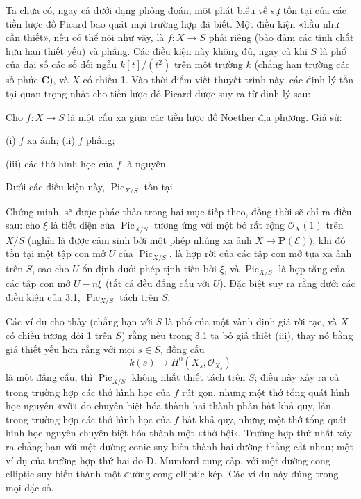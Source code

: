 
Ta chưa có, ngay cả dưới dạng phỏng đoán, một phát biểu về sự tồn tại của các
tiền lược đồ Picard bao quát mọi trường hợp đã biết. Một điều kiện «hầu như
cần thiết», nếu có thể nói như vậy, là $f:X\longrightarrow S$ phải riêng (bảo
đảm các tính chất hữu hạn thiết yếu) và phẳng. Các điều kiện này không đủ,
ngay cả khi $S$ là phổ của đại số các số đối ngẫu $k[t]/(t^2)$ trên một trường
$k$ (chẳng hạn trường các số phức $\mathbf C$), và $X$ có chiều 1. Vào thời
điểm viết thuyết trình này, các định lý tồn tại quan trọng nhất cho tiền lược
đồ Picard được suy ra từ định lý sau:

 Cho $f:X\longrightarrow S$ là một cấu xạ giữa các tiền
lược đồ Noether địa phương. Giả sử:

\noindent (i) $f$ xạ ảnh;
\noindent (ii) $f$ phẳng;

\noindent (iii) các thớ hình học của $f$ là nguyên.

Dưới các điều kiện này, $\operatorname{Pic}_{X/S}$ tồn tại.

Chứng minh, sẽ được phác thảo trong hai mục tiếp theo, đồng thời sẽ chỉ ra điều
sau: cho $\xi$ là tiết diện của $\operatorname{Pic}_{X/S}$ tương ứng với một
bó rất rộng $\mathcal O_X(1)$ trên $X/S$ (nghĩa là được cảm sinh bởi một phép
nhúng xạ ảnh $X\longrightarrow\mathbf P(\mathcal E)$); khi đó tồn tại một tập
con mở $U$ của $\operatorname{Pic}_{X/S}$, là hợp rời của các tập con mở tựa
xạ ảnh trên $S$, sao cho $U$ ổn định dưới phép tịnh tiến bởi $\xi$, và
$\operatorname{Pic}_{X/S}$ là hợp tăng của các tập con mở $U-n\xi$ (tất cả
đều đẳng cấu với $U$). Đặc biệt suy ra rằng dưới các điều kiện của 3.1,
$\operatorname{Pic}_{X/S}$ tách trên $S$.

 Các ví dụ cho thấy (chẳng hạn với $S$ là phổ của một
vành định giá rời rạc, và $X$ có chiều tương đối 1 trên $S$) rằng nếu trong
3.1 ta bỏ giả thiết (iii), thay nó bằng giả thiết yếu hơn rằng với mọi
$s\in S$, đồng cấu
\[
k(s)\longrightarrow H^0(X_s,\mathcal O_{X_s})
\]
là một đẳng cấu, thì $\operatorname{Pic}_{X/S}$ không nhất thiết tách trên
$S$; điều này xảy ra cả trong trường hợp các thớ hình học của $f$ rút gọn,
nhưng một thớ tổng quát hình học nguyên «vỡ» do chuyên biệt hóa thành hai thành
phần bất khả quy, lẫn trong trường hợp các thớ hình học của $f$ bất khả quy,
nhưng một thớ tổng quát hình học nguyên chuyên biệt hóa thành một «thớ bội».
Trường hợp thứ nhất xảy ra chẳng hạn với một đường conic suy biến thành hai
đường thẳng cắt nhau; một ví dụ của trường hợp thứ hai do D. Mumford cung cấp,
với một đường cong elliptic suy biến thành một đường cong elliptic kép. Các ví
dụ này đúng trong mọi đặc số.

